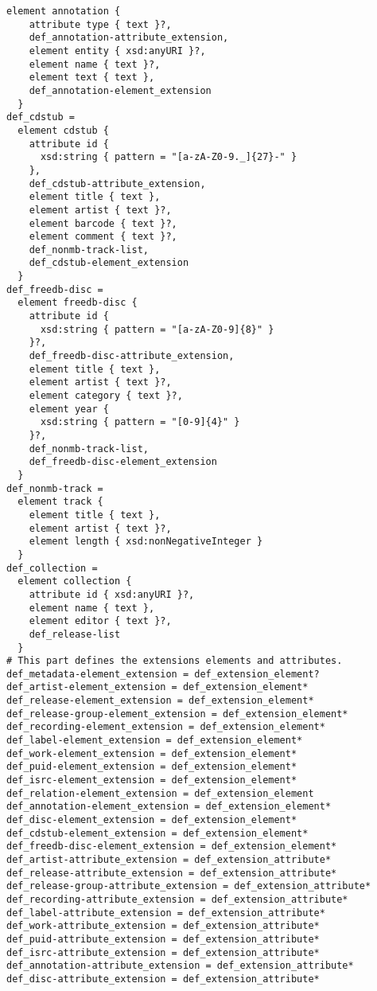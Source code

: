 \begin{Verbatim}[fontsize=\relsize{-2},frame=lines,framesep=.25in,label={[Schema Start]Schema End}]
  element annotation {
    attribute type { text }?,
    def_annotation-attribute_extension,
    element entity { xsd:anyURI }?,
    element name { text }?,
    element text { text },
    def_annotation-element_extension
  }
def_cdstub =
  element cdstub {
    attribute id {
      xsd:string { pattern = "[a-zA-Z0-9._]{27}-" }
    },
    def_cdstub-attribute_extension,
    element title { text },
    element artist { text }?,
    element barcode { text }?,
    element comment { text }?,
    def_nonmb-track-list,
    def_cdstub-element_extension
  }
def_freedb-disc =
  element freedb-disc {
    attribute id {
      xsd:string { pattern = "[a-zA-Z0-9]{8}" }
    }?,
    def_freedb-disc-attribute_extension,
    element title { text },
    element artist { text }?,
    element category { text }?,
    element year {
      xsd:string { pattern = "[0-9]{4}" }
    }?,
    def_nonmb-track-list,
    def_freedb-disc-element_extension
  }
def_nonmb-track =
  element track {
    element title { text },
    element artist { text }?,
    element length { xsd:nonNegativeInteger }
  }
def_collection =
  element collection {
    attribute id { xsd:anyURI }?,
    element name { text },
    element editor { text }?,
    def_release-list
  }
# This part defines the extensions elements and attributes.
def_metadata-element_extension = def_extension_element?
def_artist-element_extension = def_extension_element*
def_release-element_extension = def_extension_element*
def_release-group-element_extension = def_extension_element*
def_recording-element_extension = def_extension_element*
def_label-element_extension = def_extension_element*
def_work-element_extension = def_extension_element*
def_puid-element_extension = def_extension_element*
def_isrc-element_extension = def_extension_element*
def_relation-element_extension = def_extension_element
def_annotation-element_extension = def_extension_element*
def_disc-element_extension = def_extension_element*
def_cdstub-element_extension = def_extension_element*
def_freedb-disc-element_extension = def_extension_element*
def_artist-attribute_extension = def_extension_attribute*
def_release-attribute_extension = def_extension_attribute*
def_release-group-attribute_extension = def_extension_attribute*
def_recording-attribute_extension = def_extension_attribute*
def_label-attribute_extension = def_extension_attribute*
def_work-attribute_extension = def_extension_attribute*
def_puid-attribute_extension = def_extension_attribute*
def_isrc-attribute_extension = def_extension_attribute*
def_annotation-attribute_extension = def_extension_attribute*
def_disc-attribute_extension = def_extension_attribute*

\end{Verbatim}
